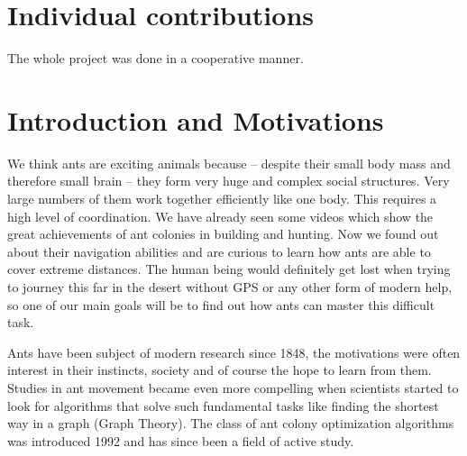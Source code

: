 \documentclass[11pt]{article}
\begin{document}

\tableofcontents

\newpage


\section{Individual contributions}
The whole project was done in a cooperative manner.
\newpage

\section{Introduction and Motivations}
We think ants are exciting animals because – despite their small body mass and therefore small brain – they form very huge and complex social structures. Very large numbers of them work together efficiently like one body. This requires a high level of coordination. We have already seen some videos which show the great achievements of ant colonies in building and hunting. Now we found out about their navigation abilities and are curious to learn how ants are able to cover extreme distances. The human being would definitely get lost when trying to journey this far in the desert without GPS or any other form of modern help, so one of our main goals will be to find out how ants can master this difficult task.

Ants have been subject of modern research since 1848, the motivations were often interest in their instincts, society and of course the hope to learn from them. Studies in ant movement became even more compelling when scientists started to look for algorithms that solve such fundamental tasks like finding the shortest way in a graph (Graph Theory). The class of ant colony optimization algorithms was introduced 1992 and has since been a field of active study.
\end{document}
